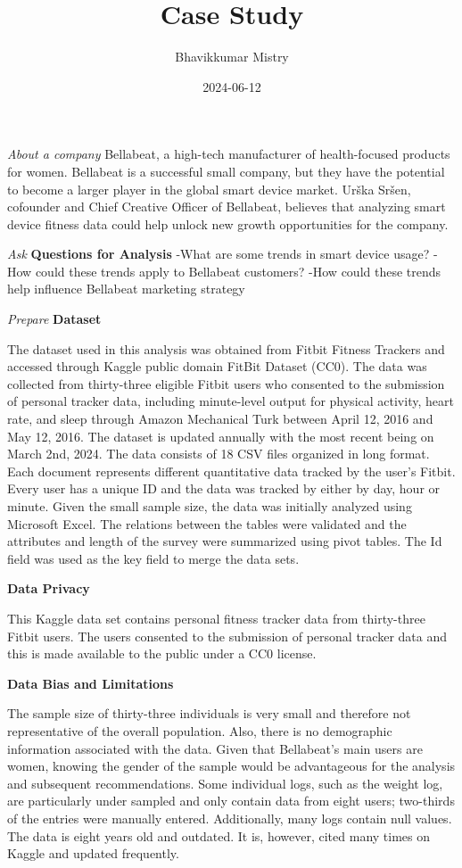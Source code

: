 \documentclass[
]{article}
\title{Case Study}
\author{Bhavikkumar Mistry}
\date{2024-06-12}
\begin{document}
\maketitle

\emph{About a company} Bellabeat, a high-tech manufacturer of
health-focused products for women. Bellabeat is a successful small
company, but they have the potential to become a larger player in the
global smart device market. Urška Sršen, cofounder and Chief Creative
Officer of Bellabeat, believes that analyzing smart device fitness data
could help unlock new growth opportunities for the company.

\emph{Ask} \textbf{Questions for Analysis} -What are some trends in
smart device usage? -How could these trends apply to Bellabeat
customers? -How could these trends help influence Bellabeat marketing
strategy

\emph{Prepare} \textbf{Dataset}

The dataset used in this analysis was obtained from Fitbit Fitness
Trackers and accessed through Kaggle public domain FitBit Dataset (CC0).
The data was collected from thirty-three eligible Fitbit users who
consented to the submission of personal tracker data, including
minute-level output for physical activity, heart rate, and sleep through
Amazon Mechanical Turk between April 12, 2016 and May 12, 2016. The
dataset is updated annually with the most recent being on March 2nd,
2024. The data consists of 18 CSV files organized in long format. Each
document represents different quantitative data tracked by the user's
Fitbit. Every user has a unique ID and the data was tracked by either by
day, hour or minute. Given the small sample size, the data was initially
analyzed using Microsoft Excel. The relations between the tables were
validated and the attributes and length of the survey were summarized
using pivot tables. The Id field was used as the key field to merge the
data sets.

\textbf{Data Privacy}

This Kaggle data set contains personal fitness tracker data from
thirty-three Fitbit users. The users consented to the submission of
personal tracker data and this is made available to the public under a
CC0 license.

\textbf{Data Bias and Limitations}

The sample size of thirty-three individuals is very small and therefore
not representative of the overall population. Also, there is no
demographic information associated with the data. Given that Bellabeat's
main users are women, knowing the gender of the sample would be
advantageous for the analysis and subsequent recommendations. Some
individual logs, such as the weight log, are particularly under sampled
and only contain data from eight users; two-thirds of the entries were
manually entered. Additionally, many logs contain null values. The data
is eight years old and outdated. It is, however, cited many times on
Kaggle and updated frequently.
\end{document}
